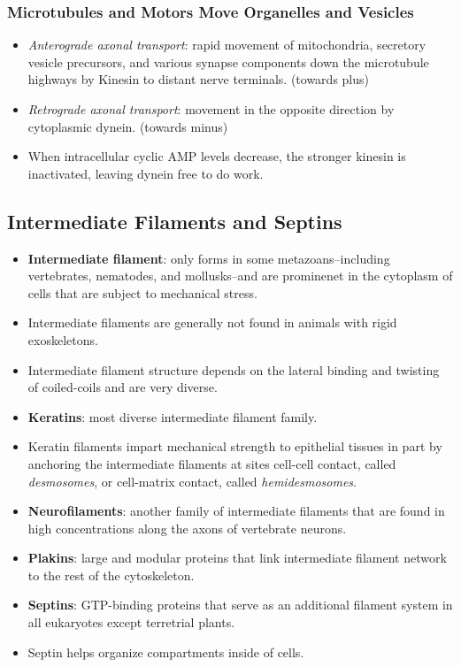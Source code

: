\documentclass[12pt,a4paper]{article}
\begin{document}
\subsubsection{Microtubules and Motors Move Organelles and Vesicles}
\begin{itemize}
    \item \textit{Anterograde axonal transport}: rapid movement of mitochondria, secretory vesicle precursors, and various synapse components down the microtubule highways by Kinesin to distant nerve terminals. (towards plus)
    \item \textit{Retrograde axonal transport}: movement in the opposite direction by cytoplasmic dynein. (towards minus)
    \item When intracellular cyclic AMP levels decrease, the stronger kinesin is inactivated, leaving dynein free to do work.
\end{itemize}

\subsection{Intermediate Filaments and Septins}
\begin{itemize}
    \item \textbf{Intermediate filament}: only forms in some metazoans--including vertebrates, nematodes, and mollusks--and are prominenet in the cytoplasm of cells that are subject to mechanical stress.
    \item Intermediate filaments are generally not found in animals with rigid exoskeletons.
    \item Intermediate filament structure depends on the lateral binding and twisting of coiled-coils and are very diverse.
    \item \textbf{Keratins}: most diverse intermediate filament family.
    \item Keratin filaments impart mechanical strength to epithelial tissues in part by anchoring the intermediate filaments at sites cell-cell contact, called \textit{desmosomes}, or cell-matrix contact, called \textit{hemidesmosomes}. 
    \item \textbf{Neurofilaments}: another family of intermediate filaments that are found in high concentrations along the axons of vertebrate neurons.
    \item \textbf{Plakins}: large and modular proteins that link intermediate filament network to the rest of the cytoskeleton.
    \item \textbf{Septins}: GTP-binding proteins that serve as an additional filament system in all eukaryotes except terretrial plants.
    \item Septin helps organize compartments inside of cells.
\end{itemize}

\end{document}
